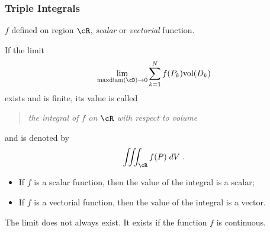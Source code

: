 \begin{frame}
  \frametitle{Triple Integrals}

  $f$ defined on region $\cR$, \emph{scalar} or \emph{vectorial} function.

  \begin{definition}
  If the limit
%
$$\lim_{\text{maxdiam}(\cD) \to 0}  \sum_{k=1}^{N} f(P_k)\text{vol}(D_k)$$
%
exists and is finite, its value is called
\begin{quote}
  \emph{the integral of $f$ on $\cR$ with respect to volume}
\end{quote}
 and is denoted by
%
$$\int\!\!\!\int\!\!\!\int_{\cR} f(P) \; dV\; .$$
  \end{definition}

\begin{itemize}
  \item If $f$ is a scalar function, then the value of the integral is a scalar;
  \item If $f$ is a vectorial function, then the value of the integral is a vector.
\end{itemize}

The limit does not always exist. It exists if the function $f$ is continuous.

\end{frame}